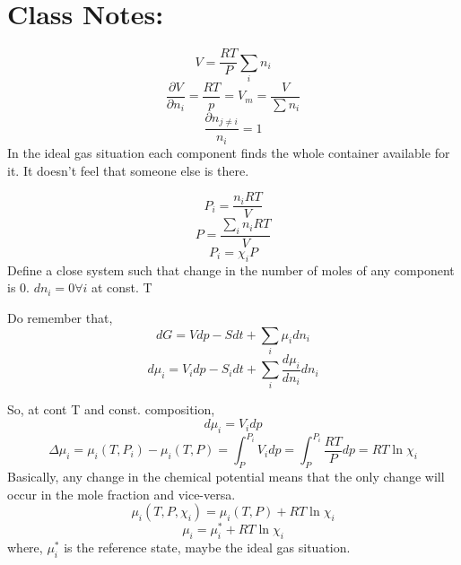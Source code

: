 \documentclass{article}
\theoremstyle{definition}
\begin{document}
\section{Class Notes:}
\[
V = \frac{RT}{P} \sum_i n_i 
\]
\[
\frac{\partial V}{\partial n_i } = \frac{RT}{p}= V_m = \frac{V}{\sum n_i}

\]
\[
\frac{\partial n_{j \neq i}}{n_i}= 1
\]
In the ideal gas situation each component finds the whole container available for it. It doesn't feel that someone else is there. 

\[
P_i = \frac{n_i RT}{V}
\]
\[
P = \frac{\sum_i n_i RT}{V}
\]
\[
P_i = \chi_i P
\]
Define a close system such that change in the number of moles of any component is 0. $dn_i = 0 \forall i$ at const. T

Do remember that, 
\[
dG = Vdp -Sdt + \sum_i \mu_idn_i
\]
\[
d\mu_i = V_idp -S_idt + \sum_i \frac{d\mu_i}{dn_i}dn_i
\]
\begin{center}
    

\end{center}
So, at cont T and const. composition,
\[
d\mu_i = V_i dp
\]
\[
\Delta \mu_i = \mu_i (T, P_i) - \mu_i(T,P) = \int_P^{P_i} V_idp = \int_P^{P_i} \frac{RT}{P} dp = RT \ln{\chi_i}
\]
Basically, any change in the chemical potential means that the only change will occur in the mole fraction and vice-versa.
\[
\mu_i (T,P, \chi_i) = \mu_i(T,P) + RT\ln{\chi_i}
\]
\[
\mu_i = \mu_i^* + RT\ln{\chi_i}
\]
where, $\mu_i^*$ is the reference state, maybe the ideal gas situation. 
\end{document}
